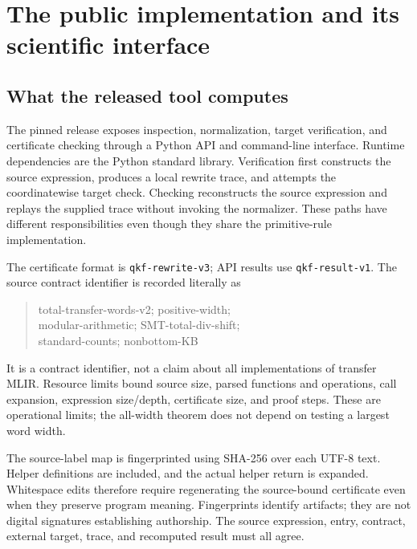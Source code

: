 \section{The public implementation and its scientific interface}\label{sec:implementation}

\subsection{What the released tool computes}
The pinned release exposes inspection, normalization, target verification, and certificate checking through a Python API and command-line interface. Runtime dependencies are the Python standard library. Verification first constructs the source expression, produces a local rewrite trace, and attempts the coordinatewise target check. Checking reconstructs the source expression and replays the supplied trace without invoking the normalizer. These paths have different responsibilities even though they share the primitive-rule implementation.

The certificate format is \texttt{qkf-rewrite-v3}; API results use \texttt{qkf-result-v1}. The source contract identifier is recorded literally as
\begin{quote}\small\ttfamily\raggedright
total-transfer-words-v2; positive-width;\\
modular-arithmetic; SMT-total-div-shift;\\
standard-counts; nonbottom-KB
\end{quote}
It is a contract identifier, not a claim about all implementations of transfer MLIR. Resource limits bound source size, parsed functions and operations, call expansion, expression size/depth, certificate size, and proof steps. These are operational limits; the all-width theorem does not depend on testing a largest word width.

The source-label map is fingerprinted using SHA-256 over each UTF-8 text. Helper definitions are included, and the actual helper return is expanded. Whitespace edits therefore require regenerating the source-bound certificate even when they preserve program meaning. Fingerprints identify artifacts; they are not digital signatures establishing authorship. The source expression, entry, contract, external target, trace, and recomputed result must all agree.

